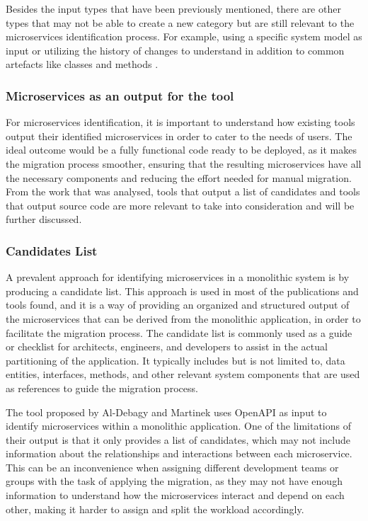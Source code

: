 \documentclass[conference]{IEEEtran}
\begin{document}
Besides the input types that have been previously mentioned, there are other
types that may not be able to create a new category but are still relevant to
the microservices identification process. For example, using a specific system
model as input  or utilizing the history of changes
to understand in addition to common artefacts like classes and methods
.

\subsubsection{Microservices as an output for the tool}

For microservices identification, it is important to understand how existing
tools output their identified microservices in order to cater to the needs of
users. The ideal outcome would be a fully functional code ready to be deployed,
as it makes the migration process smoother, ensuring that the resulting
microservices have all the necessary components and reducing the effort needed
for manual migration. From the work that was analysed, tools that output a list
of candidates and tools that output source code are more relevant to take into
consideration and will be further discussed.

\subsubsection*{Candidates List}

A prevalent approach for identifying microservices in a monolithic system is by
producing a candidate list. This approach is used in most of the publications
and tools found, and it is a way of providing an organized and structured
output of the microservices that can be derived from the monolithic
application, in order to facilitate the migration process. The candidate list
is commonly used as a guide or checklist for architects, engineers, and
developers to assist in the actual partitioning of the application. It
typically includes but is not limited to, data entities, interfaces, methods,
and other relevant system components that are used as references to guide the
migration process.

The tool proposed by Al-Debagy and Martinek  uses OpenAPI as
input to identify microservices within a monolithic application. One of the
limitations of their output is that it only provides a list of candidates,
which may not include information about the relationships and interactions
between each microservice. This can be an inconvenience when assigning
different development teams or groups with the task of applying the migration,
as they may not have enough information to understand how the microservices
interact and depend on each other, making it harder to assign and split the
workload accordingly.
\end{document}

